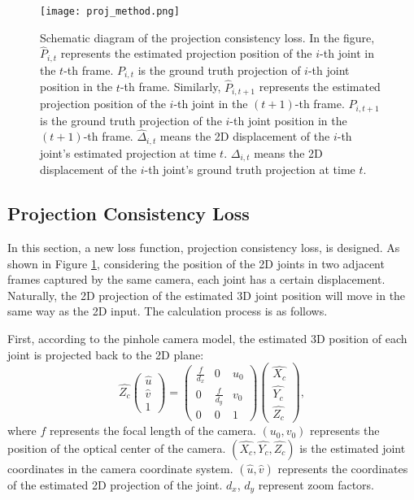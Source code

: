 \documentclass[journal]{IEEEtran}
\begin{document}
\begin{figure}
	\centering
	\texttt{[image: proj\_method.png]}
	\vspace{-0pt}
	\caption{Schematic diagram of the projection consistency loss. In the figure, $\hat P_{i,t}$ represents the estimated projection position of the $i$-th joint in the $t$-th frame.  $P_{i,t}$ is the ground truth projection of $i$-th joint position in the $t$-th frame. Similarly, $\hat P_{i,t+1}$ represents the estimated projection position of the $i$-th joint in the $(t+1)$-th frame. $P_{i,t+1}$ is the ground truth projection of the $i$-th joint position in the $(t+1)$-th frame. $\hat{\Delta}_{i,t}$ means the 2D displacement of the $i$-th joint's estimated projection at time $t$. $\Delta_{i,t}$ means the 2D displacement of the $i$-th joint's ground truth projection at time $t$.} 
	\vspace{-0pt}
	\label{fig:proj method}
\end{figure}




\subsection{Projection Consistency Loss}
\label{subsection:3.3}

In this section, a new loss function, projection consistency loss, is designed. As shown in Figure \ref{fig:proj method}, considering the position of the 2D joints in two adjacent frames captured by the same camera, each joint has a certain displacement. Naturally, the 2D projection of the estimated 3D joint position will move in the same way as the 2D input. The calculation process is as follows.

First, according to the pinhole camera model, the estimated 3D position of each joint is projected back to the 2D plane:
\begin{equation}
	\hat{Z_c}\left(
	\begin{matrix}
		\hat u\\
		\hat v\\
		1
	\end{matrix}\right)
	=\left(
	\begin{matrix}
		\frac{f}{d_x} & 0 & u_0 \\
		0 &\frac{f}{d_y} & v_0 \\
		0 & 0 & 1
	\end{matrix}\right)\left(
	\begin{matrix}
		\hat{X_c}\\
		\hat{Y_c}\\
		\hat{Z_c}
	\end{matrix}
	\right),
\end{equation}
where $f$ represents the focal length of the camera. $(u_0, v_0)$ represents the position of the optical center of the camera. $(\hat{X_c}, \hat{Y_c}, \hat{Z_c})$ is the estimated joint coordinates in the camera coordinate system. $(\hat{u}, \hat{v})$ represents the coordinates of the estimated 2D projection of the joint. $d_x$, $d_y$ represent zoom factors.
\end{document}
